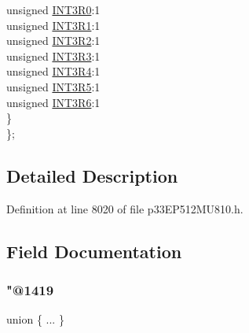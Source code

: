 \begin{DoxyCompactItemize}
\begin{tabbing}
\>\>unsigned \hyperlink{structtag_r_p_i_n_r1_b_i_t_s_a6d3e90c2072370372a06e91554760e2c}{INT3R0}:1\\
\>\>unsigned \hyperlink{structtag_r_p_i_n_r1_b_i_t_s_afdcf83ca25c9478ef807fb1eb5efc9bd}{INT3R1}:1\\
\>\>unsigned \hyperlink{structtag_r_p_i_n_r1_b_i_t_s_a453e1aee478218b37a7f2759555fb7ca}{INT3R2}:1\\
\>\>unsigned \hyperlink{structtag_r_p_i_n_r1_b_i_t_s_afe5d48f1daf5d061f403a1b860f07f97}{INT3R3}:1\\
\>\>unsigned \hyperlink{structtag_r_p_i_n_r1_b_i_t_s_a2f93b2fd5509a40a86c8459cdc8c5f5c}{INT3R4}:1\\
\>\>unsigned \hyperlink{structtag_r_p_i_n_r1_b_i_t_s_a0290df3e0a6c02759387bfb9b822e70f}{INT3R5}:1\\
\>\>unsigned \hyperlink{structtag_r_p_i_n_r1_b_i_t_s_a9d82b018188007863bd9ea3e83a345d1}{INT3R6}:1\\
\>\} \\
\}; \\

\end{tabbing}\end{DoxyCompactItemize}


\subsection{Detailed Description}


Definition at line 8020 of file p33\+E\+P512\+M\+U810.\+h.



\subsection{Field Documentation}
\mbox{\label{structtag_r_p_i_n_r1_b_i_t_s_a9ede85ef6ac2873906a1bf8bf3a97c3e}} 
\subsubsection{\texorpdfstring{"@1419}{@1419}}
{\footnotesize\ttfamily union \{ ... \} }

\mbox{\label{structtag_r_p_i_n_r1_b_i_t_s_adf71f3d8410c1f1dbbc96680a92c49af}} 
